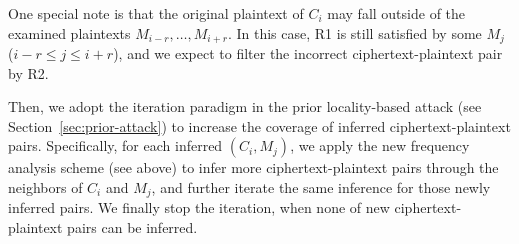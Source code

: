 One special note is that the original plaintext of $C_i$ may fall outside of
the examined plaintexts $M_{i-r}, \ldots, M_{i+r}$. 
In this case, R1 is still satisfied by some $M_j$ ($i-r \leq j \leq i+r$), and we expect to filter the incorrect ciphertext-plaintext pair by R2.     




Then, we adopt the iteration paradigm in the prior locality-based attack \cite{li17} (see Section~\ref{sec:prior-attack}) to increase the coverage of inferred ciphertext-plaintext pairs. Specifically, for each inferred $(C_i, M_j)$, we apply the new frequency analysis scheme (see above) to infer more ciphertext-plaintext pairs through the neighbors of $C_i$ and $M_j$, and further iterate the same inference for those newly inferred pairs. We finally stop the iteration, when none of new ciphertext-plaintext pairs can be inferred.         



